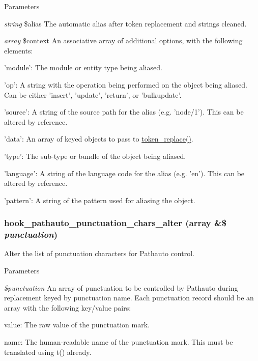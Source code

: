 \begin{DoxyParams}{Parameters}
\item[{\em string}]\$alias The automatic alias after token replacement and strings cleaned. \item[{\em array}]\$context An associative array of additional options, with the following elements:
\begin{DoxyItemize}
\item 'module': The module or entity type being aliased.
\item 'op': A string with the operation being performed on the object being aliased. Can be either 'insert', 'update', 'return', or 'bulkupdate'.
\item 'source': A string of the source path for the alias (e.g. 'node/1'). This can be altered by reference.
\item 'data': An array of keyed objects to pass to \hyperlink{includes_2token_8inc_a47eb294b05ca8d04439a9a82ccc4d82a}{token\_\-replace()}.
\item 'type': The sub-\/type or bundle of the object being aliased.
\item 'language': A string of the language code for the alias (e.g. 'en'). This can be altered by reference.
\item 'pattern': A string of the pattern used for aliasing the object. 
\end{DoxyItemize}\end{DoxyParams}
\hypertarget{pathauto_8api_8php_a9b3ef2a8def13dc74ca8ecffb2c7193c}{
\subsubsection[{hook\_\-pathauto\_\-punctuation\_\-chars\_\-alter}]{\setlength{\rightskip}{0pt plus 5cm}hook\_\-pathauto\_\-punctuation\_\-chars\_\-alter (array \&\$ {\em punctuation})}}
\label{pathauto_8api_8php_a9b3ef2a8def13dc74ca8ecffb2c7193c}
Alter the list of punctuation characters for Pathauto control.


\begin{DoxyParams}{Parameters}
\item[{\em \$punctuation}]An array of punctuation to be controlled by Pathauto during replacement keyed by punctuation name. Each punctuation record should be an array with the following key/value pairs:
\begin{DoxyItemize}
\item value: The raw value of the punctuation mark.
\item name: The human-\/readable name of the punctuation mark. This must be translated using t() already. 
\end{DoxyItemize}\end{DoxyParams}
